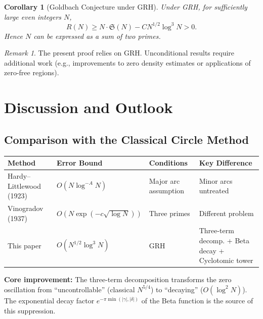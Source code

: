 \documentclass[11pt,a4paper]{article}
\newtheorem{corollary}[theorem]{Corollary}
\theoremstyle{remark}
\newtheorem{remark}[theorem]{Remark}
\begin{document}
\begin{corollary}[Goldbach Conjecture under GRH]\label{cor:goldbach}
Under GRH, for sufficiently large even integers $N$,
\begin{equation}
R(N) \geq N \cdot \mathfrak{S}(N) - C N^{1/2}\log^3 N > 0.
\end{equation}
Hence $N$ can be expressed as a sum of two primes.
\end{corollary}

\begin{remark}\label{rem:GRH}
The present proof relies on GRH. Unconditional results require additional work (e.g., improvements to zero density estimates or applications of zero-free regions).
\end{remark}

\section{Discussion and Outlook}

\subsection{Comparison with the Classical Circle Method}

\begin{center}
\begin{tabularx}{\linewidth}{@{}>{\raggedright}X>{\raggedright}X>{\raggedright\arraybackslash}X>{\raggedright\arraybackslash}X@{}}
\toprule
\textbf{Method} & \textbf{Error Bound} & \textbf{Conditions} & \textbf{Key Difference} \\
\midrule
Hardy--Littlewood (1923) & $O(N\log^{-A} N)$ & Major arc assumption & Minor arcs untreated \\
Vinogradov (1937) & $O(N\exp(-c\sqrt{\log N}))$ & Three primes & Different problem \\
This paper & $O(N^{1/2}\log^3 N)$ & GRH & Three-term decomp. + Beta decay + Cyclotomic tower \\
\bottomrule
\end{tabularx}
\end{center}

\noindent\textbf{Core improvement:} The three-term decomposition transforms the zero oscillation from ``uncontrollable'' (classical $N^{5/4}$) to ``decaying'' ($O(\log^2 N)$). The exponential decay factor $e^{-\pi\min(|\gamma|,|\delta|)}$ of the Beta function is the source of this suppression.
\end{document}
